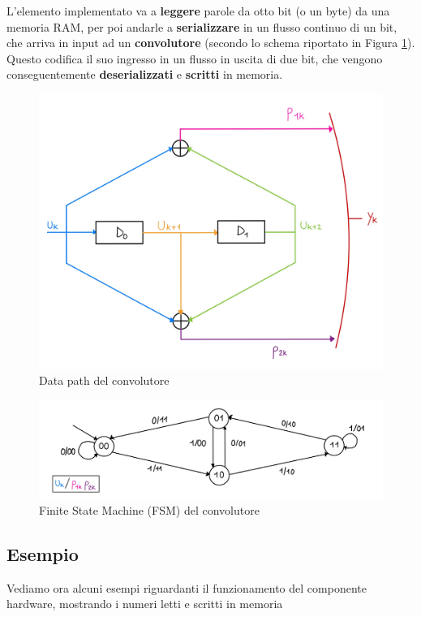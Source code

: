 \documentclass[12pt]{article} %
\begin{document}
			L'elemento implementato va a \textbf{leggere} parole da otto bit (o un byte) 
			da una memoria RAM, per poi andarle a \textbf{serializzare} in un flusso continuo di un bit, 
			che arriva in input ad un \textbf{convolutore} (secondo lo schema riportato 
			in Figura \ref{fig:ConvolutoreDataPath}). Questo codifica il suo ingresso in  
			un flusso in uscita di due bit, che vengono conseguentemente 
			\textbf{deserializzati} e \textbf{scritti} in memoria.
			\begin{figure}[h]
				\centering
				\includegraphics[width=12cm]{ConvolutoreDataPath.jpg}
				\caption{Data path del convolutore}
				\label{fig:ConvolutoreDataPath}
			\end{figure}
			\begin{figure}[h]
				\centering
				\includegraphics[width=\textwidth]{ConvolutoreFSM.jpg}
				\caption{Finite State Machine (FSM) del convolutore}
				\label{fig:ConvolutoreFSM}
			\end{figure}
		\subsection{Esempio}
			Vediamo ora alcuni esempi riguardanti il funzionamento del componente hardware, 
			mostrando i numeri letti e scritti in memoria
			
\end{document}
